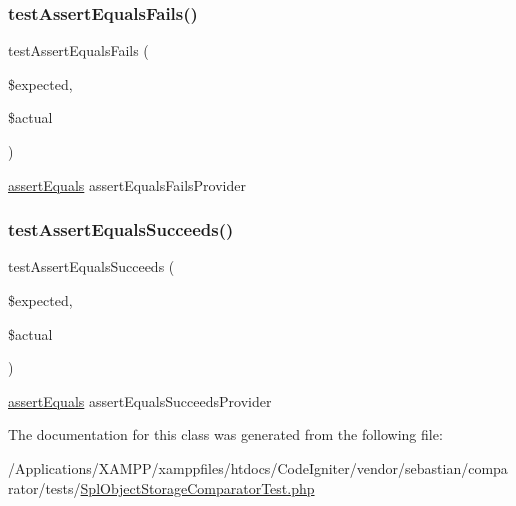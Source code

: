 \subsubsection{\texorpdfstring{test\+Assert\+Equals\+Fails()}{testAssertEqualsFails()}}
{\footnotesize\ttfamily test\+Assert\+Equals\+Fails (\begin{DoxyParamCaption}\item[{}]{\$expected,  }\item[{}]{\$actual }\end{DoxyParamCaption})}

\mbox{\hyperlink{_functions_8php_a441ec5f09711b6271edda774132eec5f}{assert\+Equals}}  assert\+Equals\+Fails\+Provider \mbox{\label{class_sebastian_bergmann_1_1_comparator_1_1_spl_object_storage_comparator_test_afb51e0f06ccb75cc8ad5b284a2e0c4cc}} 
\subsubsection{\texorpdfstring{test\+Assert\+Equals\+Succeeds()}{testAssertEqualsSucceeds()}}
{\footnotesize\ttfamily test\+Assert\+Equals\+Succeeds (\begin{DoxyParamCaption}\item[{}]{\$expected,  }\item[{}]{\$actual }\end{DoxyParamCaption})}

\mbox{\hyperlink{_functions_8php_a441ec5f09711b6271edda774132eec5f}{assert\+Equals}}  assert\+Equals\+Succeeds\+Provider 

The documentation for this class was generated from the following file\+:\begin{DoxyCompactItemize}
\item 
/\+Applications/\+X\+A\+M\+P\+P/xamppfiles/htdocs/\+Code\+Igniter/vendor/sebastian/comparator/tests/\mbox{\hyperlink{_spl_object_storage_comparator_test_8php}{Spl\+Object\+Storage\+Comparator\+Test.\+php}}\end{DoxyCompactItemize}
